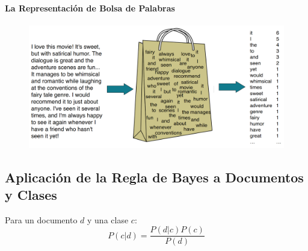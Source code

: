 \paragraph{La Representación de Bolsa de Palabras}

\begin{figure}[h]
\includegraphics[scale = 0.22]{pics/bow.png}
\end{figure}


\subsection{Aplicación de la Regla de Bayes a Documentos y Clases}
Para un documento $d$ y una clase $c$:
\[
P(c | d) = \frac{P(d | c)P(c)}{P(d)}
\]



